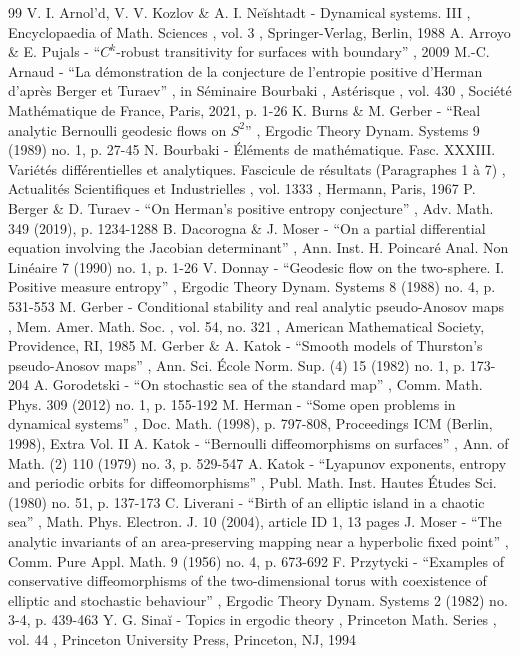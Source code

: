 \documentclass[11pt]{article}
\theoremstyle{definition}
\begin{document}
\begin{thebibliography}{99}
 V. I. Arnol’d, V. V. Kozlov \& A. I. Neĭshtadt - Dynamical systems. III , Encyclopaedia of Math. Sciences , vol. 3 , Springer-Verlag, Berlin, 1988
 A. Arroyo \& E. Pujals - “${C}^k$-robust transitivity for surfaces with boundary” , 2009
 M.-C. Arnaud - “La démonstration de la conjecture de l’entropie positive d’Herman d’après Berger et Turaev” , in Séminaire Bourbaki , Astérisque , vol. 430 , Société Mathématique de France, Paris, 2021, p. 1-26
 K. Burns \& M. Gerber - “Real analytic Bernoulli geodesic flows on $S^2$” , Ergodic Theory Dynam. Systems 9 (1989) no. 1, p. 27-45
 N. Bourbaki - Éléments de mathématique. Fasc. XXXIII. Variétés différentielles et analytiques. Fascicule de résultats (Paragraphes 1 à 7) , Actualités Scientifiques et Industrielles , vol. 1333 , Hermann, Paris, 1967
 P. Berger \& D. Turaev - “On Herman’s positive entropy conjecture” , Adv. Math. 349 (2019), p. 1234-1288
 B. Dacorogna \& J. Moser - “On a partial differential equation involving the Jacobian determinant” , Ann. Inst. H. Poincaré Anal. Non Linéaire 7 (1990) no. 1, p. 1-26
 V. Donnay - “Geodesic flow on the two-sphere. I. Positive measure entropy” , Ergodic Theory Dynam. Systems 8 (1988) no. 4, p. 531-553
 M. Gerber - Conditional stability and real analytic pseudo-Anosov maps , Mem. Amer. Math. Soc. , vol. 54, no. 321 , American Mathematical Society, Providence, RI, 1985
 M. Gerber \& A. Katok - “Smooth models of Thurston’s pseudo-Anosov maps” , Ann. Sci. École Norm. Sup. (4) 15 (1982) no. 1, p. 173-204
 A. Gorodetski - “On stochastic sea of the standard map” , Comm. Math. Phys. 309 (2012) no. 1, p. 155-192
 M. Herman - “Some open problems in dynamical systems” , Doc. Math. (1998), p. 797-808, Proceedings ICM (Berlin, 1998), Extra Vol. II
 A. Katok - “Bernoulli diffeomorphisms on surfaces” , Ann. of Math. (2) 110 (1979) no. 3, p. 529-547
 A. Katok - “Lyapunov exponents, entropy and periodic orbits for diffeomorphisms” , Publ. Math. Inst. Hautes Études Sci. (1980) no. 51, p. 137-173
 C. Liverani - “Birth of an elliptic island in a chaotic sea” , Math. Phys. Electron. J. 10 (2004), article ID 1, 13 pages
 J. Moser - “The analytic invariants of an area-preserving mapping near a hyperbolic fixed point” , Comm. Pure Appl. Math. 9 (1956) no. 4, p. 673-692
 F. Przytycki - “Examples of conservative diffeomorphisms of the two-dimensional torus with coexistence of elliptic and stochastic behaviour” , Ergodic Theory Dynam. Systems 2 (1982) no. 3-4, p. 439-463
 Y. G. Sinaĭ - Topics in ergodic theory , Princeton Math. Series , vol. 44 , Princeton University Press, Princeton, NJ, 1994
\end{thebibliography}
\end{document}
